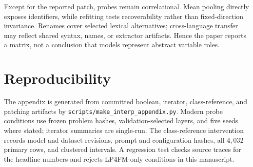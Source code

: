 \documentclass{article}
\begin{document}
Except for the reported patch, probes remain correlational. Mean pooling
directly exposes identifiers, while refitting tests recoverability rather than
fixed-direction invariance. Renames cover selected lexical alternatives;
cross-language transfer may reflect shared syntax, names, or extractor
artifacts. Hence the paper reports a matrix, not a conclusion that models
represent abstract variable roles.




\appendix


\section{Reproducibility}
\label{app:repro}
The appendix is generated from committed boolean, iterator, class-reference,
and patching artifacts by \texttt{scripts/make\_interp\_appendix.py}. Modern
probe conditions use frozen problem hashes, validation-selected layers, and
five seeds where stated; iterator summaries are single-run. The
class-reference intervention records model and dataset
revisions, prompt and configuration hashes, all $4{,}032$ primary rows, and
clustered intervals. A regression test checks source traces for the headline
numbers and rejects LP4FM-only conditions in this manuscript.

\clearpage

\end{document}
